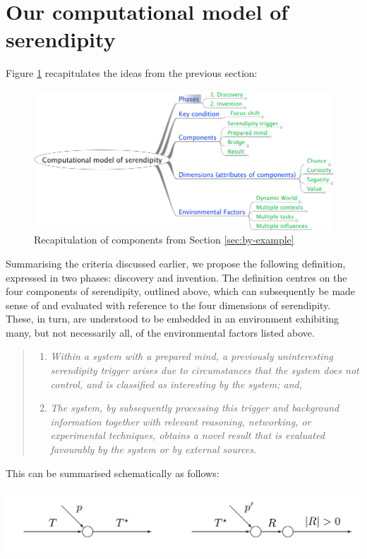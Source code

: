 \section{Our computational model of serendipity} \label{sec:our-model}

Figure \ref{model-diagram} recapitulates the ideas from the previous section:

\begin{figure}
\begin{center}
\includegraphics[width=.8\textwidth]{figures/model-diagram/mm-model-diagram-no-desc.png}
\end{center}
\caption{Recapitulation of components from Section \ref{sec:by-example}}
\label{model-diagram}
\end{figure}

Summarising the criteria discussed earlier, we propose the following
definition, expressed in two phases: discovery and invention.  The
definition centres on the four components of serendipity, outlined
above, which can subsequently be made sense of and evaluated with
reference to the four dimensions of serendipity.  These, in turn, are
understood to be embedded in an environment exhibiting many, but not
necessarily all, of the environmental factors listed above.

\begin{quote}
\begin{enumerate}[itemsep=2pt,labelwidth=9em,leftmargin=6em,rightmargin=2em]
\item[\emph{(\textbf{1 - Discovery})}] \emph{Within a system with a prepared mind, a previously uninteresting serendipity trigger arises due to circumstances that the system does not control, and is classified as interesting by the system; and,}
\item[\emph{(\textbf{2 - Invention})}] \emph{The system, by subsequently processing this trigger and background information together with relevant reasoning, networking, or experimental techniques, obtains a novel result that is evaluated favourably by the system or by external sources.}
\end{enumerate}
\end{quote}

This can be summarised schematically as follows:

% 
{\centering
\includegraphics[width=.8\textwidth]{schematic}
\par}

